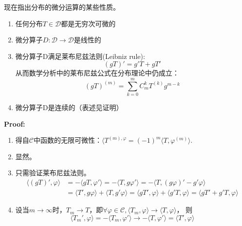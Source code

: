 \documentclass{ctexbook}
\begin{document}
现在指出分布的微分运算的某些性质。
\begin{enumerate}
    \item 任何分布$T\in\mathcal{D} $都是无穷次可微的
    \item 微分算子$D:\mathcal{D} \to\mathcal{D} $是线性的
    \item 微分算子D满足莱布尼兹法则(Leibniz rule):
          \[(gT)'=g'T+gT'\]从而数学分析中的莱布尼兹公式在分布理论中仍成立：
          \[(gT)^{(m)}=\sum_{k=0}^{m}C_m^k T^{(k)}g^{m-k}\]
    \item 微分算子D是连续的（表述见证明）
\end{enumerate}
\textbf{Proof:}\begin{enumerate}
    \item 得自$\mathcal{C} $中函数的无限可微性：$\langle T^{(m),\varphi}=(-1)^m\langle T,\varphi^{(m)}\rangle$.
    \item 显然。
    \item 只需验证莱布尼兹法则。
          \begin{align*}
              \langle (gT)',\varphi\rangle & =-\langle gT,\varphi'\rangle=-\langle T,g\varphi'\rangle=-\langle T,(g\varphi)'-g'\varphi\rangle                                            \\
                                           & =\langle T',g\varphi\rangle+\langle T,g'\varphi\rangle=\langle gT',\varphi\rangle+\langle g'T,\varphi\rangle=\langle gT'+g'T,\varphi\rangle
          \end{align*}
    \item 设当$m\to\infty$时，$T_m\to T$，即$\forall\varphi\in\mathcal{C} ,\langle T_m,\varphi\rangle\to\langle T,\varphi\rangle$，
          则\[\langle T_m',\varphi\rangle=-\langle T_m,\varphi'\rangle\to-\langle T,\varphi'\rangle=\langle T',\varphi\rangle\]
\end{enumerate}
\end{document}
